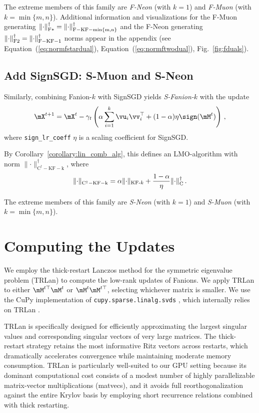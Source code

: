 \documentclass[smallextended,referee,envcountsect]{svjour3}
\newcommand{\norm}[1]{\lVert #1\rVert}
\DeclarePairedDelimiter{\normc}{\|}{\|_{\mathrm{C}}}
\DeclarePairedDelimiter{\normkfk}{\|}{\|_{\text{KF-}k}}
\DeclarePairedDelimiter{\normfstar}{\|}{\|_\mathrm{F*}}
\DeclarePairedDelimiter{\normftwo}{\|}{\|_\mathrm{F2}}
\newcommand{\figureref}[1]{Fig.~\ref{#1}}
\newcommand{\equationref}[1]{Equation~(\ref{#1})}
\newcommand{\corollaryref}[1]{Corollary~\ref{#1}}
\begin{document}
 The extreme members of this family are \emph{F-Neon} (with $k = 1$) and \emph{F-Muon} (with $k = \min\{m, n\}$). Additional information and visualizations for the F-Muon generating $\normfstar{\cdot}^\dagger = \norm{\cdot}_{\mathrm{F-KF-\min\{m, n\}}}^\dagger$ and the F-Neon generating $\normftwo{\cdot}^\dagger = \norm{\cdot}_{\mathrm{F-KF-1}}^\dagger$ norms appear in the appendix (see \equationref{eq:normfstardual}, \equationref{eq:normftwodual}, \figureref{fig:fduals}).
 
 \subsection{Add SignSGD: S-Muon and S-Neon}
 
 Similarly, combining Fanion-$k$ with SignSGD yields \emph{S-Fanion-$k$} with the update
 \begin{equation}\label{eq:sign_muon_update}
     \mX^{t+1} = \mX^{t} - \gamma_t \left(\alpha \sum_{i = 1}^k \vu_i \vv_i^\top + (1-\alpha)\eta\sign(\mM^t)\right)\,,
 \end{equation}
 where \texttt{sign\_lr\_coeff} $\eta$ is a scaling coefficient for SignSGD.
 
 By \corollaryref{corollary:lin_comb_alg}, this defines an LMO-algorithm with norm $\norm{\cdot}_{\mathrm{C^\dagger-KF-k}}^\dagger$, where
 \begin{equation}\label{eq:ckfk_norm}
   \norm{\cdot}_{\mathrm{C^\dagger-KF-k}} = \alpha \normkfk{\cdot} + \frac{1-\alpha}{\eta}\normc{\cdot}^\dagger\,.
 \end{equation}
 
 The extreme members of this family are \emph{S-Neon} (with $k = 1$) and \emph{S-Muon} (with $k = \min\{m, n\}$).
 
 \section{Computing the Updates}\label{sec:matrix-side}
 We employ the thick-restart Lanczos method for the symmetric eigenvalue problem (TRLan) to compute the low-rank updates of Fanions. We apply TRLan to either $\mM^{t\top}\mM^t$ or $\mM^t \mM^{t\top}$, selecting whichever matrix is smaller. We use the CuPy implementation of \texttt{cupy.sparse.linalg.svds} \citep{cupy_svds_ref}, which internally relies on TRLan \citep{simonz1998thick}.
 
 TRLan is specifically designed for efficiently approximating the largest singular values and corresponding singular vectors of very large matrices. The thick-restart strategy retains the most informative Ritz vectors across restarts, which dramatically accelerates convergence while maintaining moderate memory consumption. TRLan is particularly well-suited to our GPU setting because its dominant computational cost consists of a modest number of highly parallelizable matrix-vector multiplications (matvecs), and it avoids full reorthogonalization against the entire Krylov basis by employing short recurrence relations combined with thick restarting.
 
\end{document}

